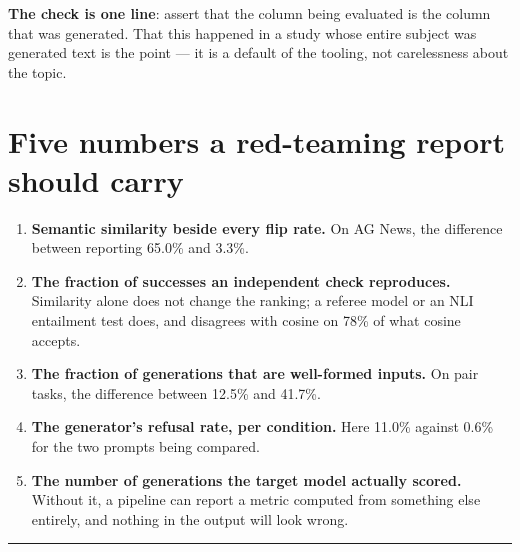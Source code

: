 \documentclass[11pt]{article}
\begin{document}
\textbf{The check is one line}: assert that the column being evaluated is the column
that was generated. That this happened in a study whose entire subject was generated
text is the point --- it is a default of the tooling, not carelessness about the
topic.

\section*{Five numbers a red-teaming report should carry}

\begin{enumerate}[itemsep=3pt]
\item \textbf{Semantic similarity beside every flip rate.} On AG News, the
      difference between reporting 65.0\% and 3.3\%.
\item \textbf{The fraction of successes an independent check reproduces.}
      Similarity alone does not change the ranking; a referee model or an NLI
      entailment test does, and disagrees with cosine on 78\% of what cosine
      accepts.
\item \textbf{The fraction of generations that are well-formed inputs.} On pair
      tasks, the difference between 12.5\% and 41.7\%.
\item \textbf{The generator's refusal rate, per condition.} Here 11.0\% against
      0.6\% for the two prompts being compared.
\item \textbf{The number of generations the target model actually scored.} Without
      it, a pipeline can report a metric computed from something else entirely, and
      nothing in the output will look wrong.
\end{enumerate}

\vspace{4pt}
\hrule
\vspace{4pt}
\end{document}
